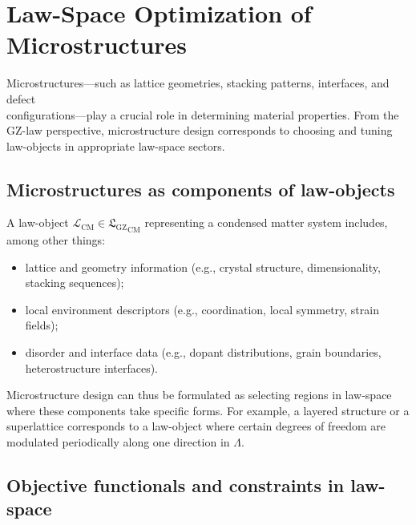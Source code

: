 \documentclass[11pt]{book}
\newcommand{\GZLS}{\ensuremath{\mathfrak{L}_{\mathrm{GZ}}}}
\theoremstyle{plain}
\theoremstyle{definition}
\theoremstyle{remark}
\begin{document}
\section{Law-Space Optimization of Microstructures}
\label{sec:lawspace-optimization-microstructures}


Microstructures—such as lattice geometries, stacking patterns,
interfaces, and defect \\configurations—play a crucial role in
determining material properties. From the GZ-law perspective,
microstructure design corresponds to choosing and tuning law-objects
in appropriate law-space sectors.

\subsection*{Microstructures as components of law-objects}

A law-object $\mathcal{L}_{\mathrm{CM}} \in {\GZLS}_{\mathrm{CM}}$
representing a condensed matter system includes, among other things:
\begin{itemize}
  \item lattice and geometry information (e.g., crystal structure,
        dimensionality, stacking sequences);
  \item local environment descriptors (e.g., coordination, local
        symmetry, strain fields);
  \item disorder and interface data (e.g., dopant distributions,
        grain boundaries, heterostructure interfaces).
\end{itemize}

Microstructure design can thus be formulated as selecting regions in
law-space where these components take specific forms. For example,
a layered structure or a superlattice corresponds to a law-object
where certain degrees of freedom are modulated periodically along
one direction in $\Lambda$.

\subsection*{Objective functionals and constraints in law-space}
\end{document}
